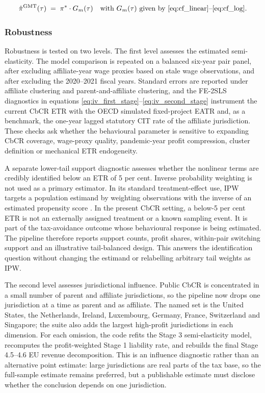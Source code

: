 \documentclass[11pt,a4paper]{article}
\begin{document}
\begin{equation}\label{eq:counterfactual_profit}
\hat{\pi}^{\text{GMT}}(\tau) \;=\; \pi^{*} \cdot G_m(\tau) \quad \text{with } G_m(\tau) \text{ given by \eqref{eq:cf_linear}--\eqref{eq:cf_log}.}
\end{equation}

\subsubsection{Robustness}\label{sec:estimation_robustness}

Robustness is tested on two levels. The first level assesses the estimated semi-elasticity. The model comparison is repeated on a balanced six-year pair panel, after excluding affiliate-year wage proxies based on stale wage observations, and after excluding the 2020--2021 fiscal years. Standard errors are reported under affiliate clustering and parent-and-affiliate clustering, and the FE-2SLS diagnostics in equations \eqref{eq:iv_first_stage}--\eqref{eq:iv_second_stage} instrument the current CbCR ETR with the OECD simulated fixed-project EATR and, as a benchmark, the one-year lagged statutory CIT rate of the affiliate jurisdiction. These checks ask whether the behavioural parameter is sensitive to expanding CbCR coverage, wage-proxy quality, pandemic-year profit compression, cluster definition or mechanical ETR endogeneity.

A separate lower-tail support diagnostic assesses whether the nonlinear terms are credibly identified below an ETR of 5 per cent. Inverse probability weighting is not used as a primary estimator. In its standard treatment-effect use, IPW targets a population estimand by weighting observations with the inverse of an estimated propensity score \citep{hirano2003}. In the present CbCR setting, a below-5 per cent ETR is not an externally assigned treatment or a known sampling event. It is part of the tax-avoidance outcome whose behavioural response is being estimated. The pipeline therefore reports support counts, profit shares, within-pair switching support and an illustrative tail-balanced design. This answers the identification question without changing the estimand or relabelling arbitrary tail weights as IPW.

The second level assesses jurisdictional influence. Public CbCR is concentrated in a small number of parent and affiliate jurisdictions, so the pipeline now drops one jurisdiction at a time as parent and as affiliate. The named set is the United States, the Netherlands, Ireland, Luxembourg, Germany, France, Switzerland and Singapore; the suite also adds the largest high-profit jurisdictions in each dimension. For each omission, the code refits the Stage 3 semi-elasticity model, recomputes the profit-weighted Stage 1 liability rate, and rebuilds the final Stage 4.5--4.6 EU revenue decomposition. This is an influence diagnostic rather than an alternative point estimate: large jurisdictions are real parts of the tax base, so the full-sample estimate remains preferred, but a publishable estimate must disclose whether the conclusion depends on one jurisdiction.
\end{document}

